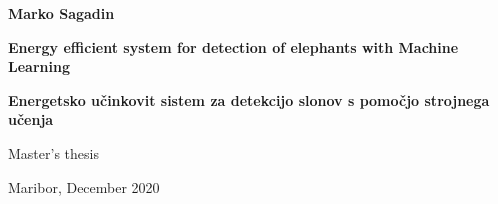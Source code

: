 \begin{titlepage}
    \begin{center}
 
        \vspace*{6.4cm}

        \textbf{Marko Sagadin}

        \vspace{0.5cm}

        \fontsize{26}{26}
        \selectfont
        \textbf{Energy efficient system for detection of elephants with Machine Learning}
 
        \vspace{1.0cm}

        \fontsize{26}{26}
        \selectfont
        \textbf{Energetsko učinkovit sistem za detekcijo slonov s pomočjo strojnega učenja}

        \vspace{0.5cm}

        \fontsize{16}{18}
        \selectfont
        Master's thesis
 
        \vspace*{\fill}

        Maribor, December 2020 
 
 
    \end{center}
\end{titlepage}
